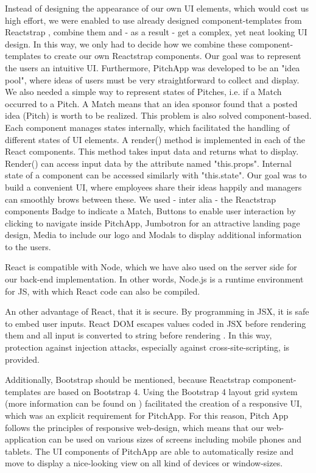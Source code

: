 Instead of designing the appearance of our own UI elements, which would cost us high effort, we were enabled to use already designed component-templates from Reactstrap \parencite{Reactstrap_comp}, combine them and - as a result - get a complex, yet neat looking UI design. In this way, we only had to decide how we combine these component-templates to create our own Reactstrap components. Our goal was to represent the users an intuitive UI. Furthermore, PitchApp was developed to be an "idea pool", where ideas of users must be very straightforward to collect and display. We also needed a simple way to represent states of Pitches, i.e. if a Match occurred to a Pitch. A Match means that an idea sponsor found that a posted idea (Pitch) is worth to be realized. This problem is also solved component-based. Each component manages states internally, which facilitated the handling of different states of UI elements. A render() method is implemented in each of the React components. This method takes input data and returns what to display. Render() can access input data by the attribute named "this.props". Internal state of a component can be accessed similarly with "this.state". Our goal was to build a convenient UI, where employees share their ideas happily and managers can smoothly brows between these. We used - inter alia - the Reactstrap components Badge to indicate a Match, Buttons to enable user interaction by clicking to navigate inside PitchApp, Jumbotron for an attractive landing page design, Media to include our logo and Modals to display additional information to the users.

React is compatible with Node, which we have also used on the server side for our back-end implementation. In other words, Node.js is a runtime environment for JS, with which React code can also be compiled.

An other advantage of React, that it is secure. By programming in JSX, it is safe to embed user inputs. React DOM escapes values coded in JSX before rendering them and all input is converted to string before rendering \parencite{JSX}. In this way, protection against injection attacks, especially against cross-site-scripting, is provided.

Additionally, Bootstrap \parencite{Bootstrap} should be mentioned, because Reactstrap component-templates are based on Bootstrap 4. Using the Bootstrap 4 layout grid system (more information can be found on \parencite{Bootstrap_grid}) facilitated the creation of a responsive UI, which was an explicit requirement for PitchApp. For this reason, Pitch App follows the principles of responsive web-design, which means that our web-application can be used on various sizes of screens including mobile phones and tablets. The UI components of PitchApp are able to automatically resize and move to display a nice-looking view on all kind of devices or window-sizes.


